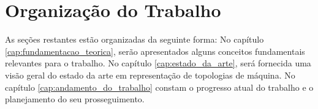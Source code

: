 \section{Organização do Trabalho}
\label{sec:organizacao_do_trabalho}

As seções restantes estão organizadas da seguinte forma:
No capítulo \ref{cap:fundamentacao_teorica}, serão apresentados alguns conceitos fundamentais relevantes para o trabalho.
No capítulo \ref{cap:estado_da_arte}, será fornecida uma visão geral do estado da arte em representação de topologias de máquina.
No capítulo \ref{cap:andamento_do_trabalho} constam o progresso atual do trabalho e o planejamento do seu prosseguimento.










